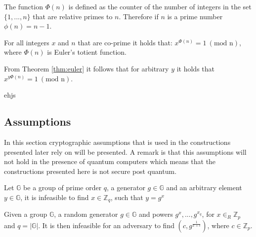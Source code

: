 \begin{Mydef}
The function $\Phi(n)$ is defined as the counter of the number of integers in the set $\{1,...,n\}$ that are relative primes to $n$. Therefore if $n$ is a prime number $\phi(n) = n-1$.
\end{Mydef}
\vspace{10pt}
\begin{thm}
\label{thm:euler}
For all integers $x$ and $n$ that are co-prime it holds that:
$x^{\Phi(n)} = 1\:( \text{mod n})$, where $\Phi(n)$ is Euler's totient function.
\end{thm}
\vspace{10pt}
From Theorem \ref{thm:euler} it follows that for arbitrary $y$ it holds that $x^{y\Phi(n)} = 1 \:( \text{mod n})$.
\vspace{10pt}
\begin{Mydef}
ehjs
\end{Mydef}

\subsection*{Assumptions}
In this section cryptographic assumptions that is used in the constructions presented later rely on will be presented. A remark is that this assumptions will not hold in the presence of quantum computers which means that the constructions presented here is not secure post quantum.
\\
\begin{Ass}
Let $\mathds{G}$ be a group of prime order $q$, a generator $g\in \mathds{G}$ and an arbitrary element $y \in\mathds{G}$, it is  infeasible to find $x \in \mathds{Z}_q$, such that $y=g^x$
\end{Ass}
\vspace{10pt}
\begin{Ass}
 Given a group $\mathds{G}$, a random generator $g\in \mathds{G}$ and powers $g^x,...,g^{x_q}$, for $x \in_R \mathds{Z}_p$ and  $q= |\mathds{G}|$. It is then  infeasible for an adversary to find $(c, g^{\frac{1}{x+c}})$, where $c \in \mathds{Z}_p$.
\end{Ass}



